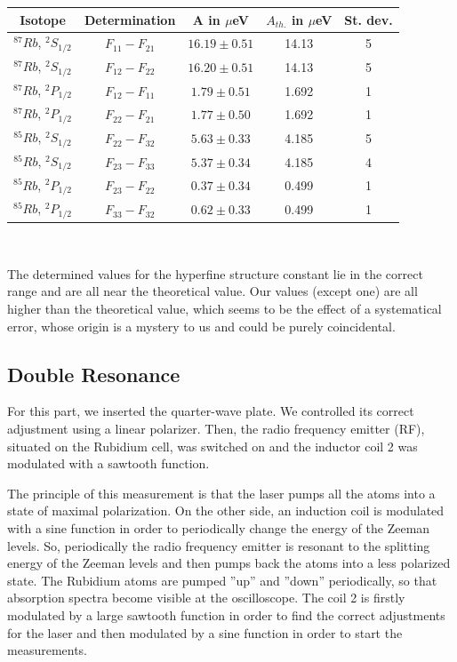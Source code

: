 \begin{center}
\begin{tabular}[H]{c c | c c c}
Isotope & Determination & A in $\mu$eV & $A_{th.}$ in $\mu$eV & St. dev.\\ \hline
$^{87}Rb$, $^2S_{1/2}$ &  $F_{11} - F_{21}$ & $16.19 \pm 0.51$ & 14.13  & 5 \\
$^{87}Rb$, $^2S_{1/2}$ &  $F_{12} - F_{22}$ & $16.20 \pm 0.51$ & 14.13  & 5 \\
$^{87}Rb$, $^2P_{1/2}$ &  $F_{12} - F_{11}$ &  $1.79 \pm 0.51$ & 1.692   & 1 \\
$^{87}Rb$, $^2P_{1/2}$ &  $F_{22} - F_{21}$ &  $1.77 \pm 0.50$ & 1.692   & 1 \\
$^{85}Rb$, $^2S_{1/2}$ &  $F_{22} - F_{32}$ &  $5.63 \pm 0.33$ & 4.185   & 5 \\
$^{85}Rb$, $^2S_{1/2}$ &  $F_{23} - F_{33}$ &  $5.37 \pm 0.34$ & 4.185   & 4 \\
$^{85}Rb$, $^2P_{1/2}$ &  $F_{23} - F_{22}$ &  $0.37 \pm 0.34$ & 0.499   & 1 \\
$^{85}Rb$, $^2P_{1/2}$ &  $F_{33} - F_{32}$ &  $0.62 \pm 0.33$ & 0.499   & 1 \\
\end{tabular}\\
\end{center}

The determined values for the hyperfine structure constant lie in the correct range and are all near the theoretical value. Our values (except one) are all higher than the theoretical value, which seems to be the effect of a systematical error, whose origin is a mystery to us and could be purely coincidental.



\subsection{Double Resonance}

For this part, we inserted the quarter-wave plate. We controlled its correct adjustment using a linear polarizer. Then, the radio frequency emitter (RF), situated on the Rubidium cell, was switched on and the inductor coil 2 was modulated with a sawtooth function.

The principle of this measurement is that the laser pumps all the atoms into a state of maximal polarization. On the other side, an induction coil is modulated with a sine function in order to periodically change the energy of the Zeeman levels. So, periodically the radio frequency emitter is resonant to the splitting energy of the Zeeman levels and then pumps back the atoms into a less polarized state. The Rubidium atoms are pumped ''up'' and ''down'' periodically, so that absorption spectra become visible at the oscilloscope. The coil 2 is firstly modulated by a large sawtooth function in order to find the correct adjustments for the laser and then modulated by a sine function in order to start the measurements.

